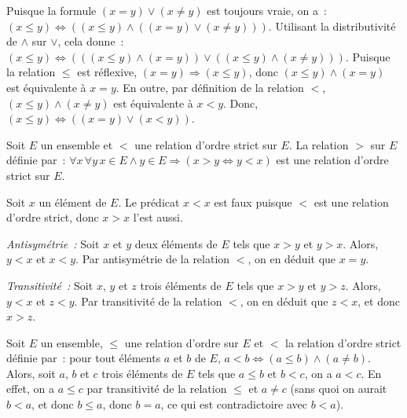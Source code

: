 \blank[medium]

\noindent{} 
    Puisque la formule $(x = y) \vee (x \neq y)$ est toujours vraie, on a : $(x \leq y) \Leftrightarrow ((x \leq y) \wedge ((x = y) \vee (x \neq y)))$. 
    Utilisant la distributivité de $\wedge$ sur $\vee$, cela donne : $(x \leq y) \Leftrightarrow (((x \leq y) \wedge (x = y)) \vee ((x \leq y) \wedge (x \neq y)))$.
    Puisque la relation $\leq$ est réflexive, $(x = y) \Rightarrow (x \leq y)$, donc $(x \leq y) \wedge (x = y)$ est équivalente à $x = y$.
    En outre, par définition de la relation $<$, $(x \leq y) \wedge (x \neq y)$ est équivalente à $x < y$. 
    Donc, $(x \leq y) \Leftrightarrow ((x = y) \vee (x < y))$.

   \done 

\blank[medium]

\noindent{} Soit $E$ un ensemble et $<$ une relation d'ordre strict sur $E$. 
    La relation $>$ sur $E$ définie par : $\forall x \, \forall y \, x \in E \wedge y \in E \Rightarrow (x > y \Leftrightarrow y < x)$ est une relation d'ordre strict sur $E$. 

\blank[medium]

\noindent{}
\startitemize[nowhite]
    \item Soit $x$ un élément de $E$. Le prédicat $x < x$ est faux puisque $<$ est une relation d'ordre strict, donc $x > x$ l'est aussi. 
    \item \emph{Antisymétrie :} Soit $x$ et $y$ deux éléments de $E$ tels que $x > y$ et $y > x$.
        Alors, $y < x$ et $x < y$.
        Par antisymétrie de la relation $<$, on en déduit que $x = y$.
    \item \emph{Transitivité :} Soit $x$, $y$ et $z$ trois éléments de $E$ tels que $x > y$ et $y > z$.
        Alors, $y < x$ et $z < y$.
        Par transitivité de la relation $<$, on en déduit que $z < x$, et donc $x > z$.
\stopitemize

\done

\blank[medium]

Soit $E$ un ensemble, $\leq$ une relation d'ordre sur $E$ et $<$ la relation d'ordre strict définie par : pour tout éléments $a$ et $b$ de $E$, $a < b \Leftrightarrow (a \leq b) \wedge (a \neq b)$. 
Alors, soit $a$, $b$ et $c$ trois éléments de $E$ tels que $a \leq b$ et $b < c$, on a $a < c$. 
En effet, on a $a \leq c$ par transitivité de la relation $\leq$ et $a \neq c$ (sans quoi on aurait $b < a$, et donc $b \leq a$, donc $b = a$, ce qui est contradictoire avec $b < a$). 

